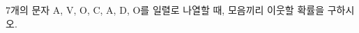 $7$개의 문자 $\mathrm{A}$, $\mathrm{V}$, $\mathrm{O}$, $\mathrm{C}$, $\mathrm{A}$, $\mathrm{D}$, $\mathrm{O}$를 일렬로 나열할 때, 모음끼리 이웃할 확률을 구하시오.
